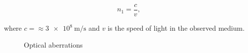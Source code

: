 \begin{equation}
\label{eq:snell}
n_1  = \frac{c}{v},
\end{equation}

where $c=\approx \SI{3e+8}{\meter\per\second}$ and $v$ is the speed of light in the observed medium.


\begin{figure}
    \centering
    \caption{Optical aberrations}
    \label{fig:aberration}
\end{figure}
